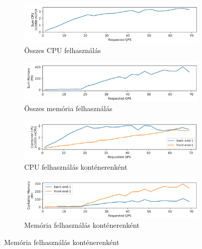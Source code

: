 \begin{figure}
\centering
\begin{subfigure}{\textwidth}
    \includegraphics[width=\textwidth]{figures/3FE-1BE-stack/sum-cpu.png}
    \caption{Összes CPU felhasználás}
    \label{subfig:stack-sum-cpu}
\end{subfigure}

\hfill
\begin{subfigure}{\textwidth}
    \includegraphics[width=\textwidth]{figures/3FE-1BE-stack/sum-mem.png}
    \caption{Összes memória felhasználás}
    \label{subfig:stack-sum-mem}
\end{subfigure}

\hfill
\begin{subfigure}{\textwidth}
    \includegraphics[width=\textwidth]{figures/3FE-1BE-stack/container-cpu.png}
    \caption{CPU felhasználás konténerenként}
    \label{subfig:stack-container-cpu}
\end{subfigure}

\hfill
\begin{subfigure}{\textwidth}
    \includegraphics[width=\textwidth]{figures/3FE-1BE-stack/container-mem.png}
    \caption{Memória felhasználás konténerenként}
    \label{subfig:stack-container-mem}
\end{subfigure}


\end{figure}
